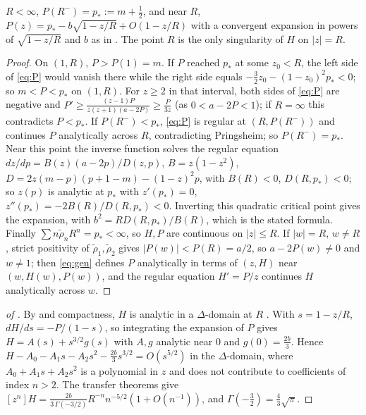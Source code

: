 \documentclass[11pt,a4paper]{report}
\newcommand{\rtil}{\tilde\rho}
\begin{document}
\begin{lemma}\label{lem:turning}
\(R<\infty\), \(P(R^-)=p_*:=m+\frac12\), and near \(R\),
\(P(z)=p_*-b\sqrt{1-z/R}+O(1-z/R)\) with a convergent expansion in powers of \(\sqrt{1-z/R}\) and \(b\) as in
. The point \(R\) is the only singularity of \(H\) on \(|z|=R\).
\end{lemma}
\begin{proof}
On \((1,R)\), \(P>P(1)=m\). If \(P\) reached \(p_*\) at some \(z_0<R\), the left side of \eqref{eq:P} would
vanish there while the right side equals \(-\frac32z_0-(1-z_0)^2p_*<0\); so \(m<P<p_*\) on \((1,R)\). For
\(z\ge2\) in that interval, both sides of \eqref{eq:P} are negative and
\(P'\ge\frac{(z-1)P}{z(z+1)(a-2P)}\ge\frac P{3z}\) (as \(0<a-2P<1\)); if \(R=\infty\) this contradicts
\(P<p_*\). If \(P(R^-)<p_*\), \eqref{eq:P} is regular at \((R,P(R^-))\) and continues \(P\) analytically
across \(R\), contradicting Pringsheim; so \(P(R^-)=p_*\). Near this point the inverse function solves the
regular equation \(dz/dp=B(z)(a-2p)/D(z,p)\), \(B=z(1-z^2)\), \(D=2z(m-p)(p+1-m)-(1-z)^2p\), with
\(B(R)<0\), \(D(R,p_*)<0\); so \(z(p)\) is analytic at \(p_*\) with \(z'(p_*)=0\),
\(z''(p_*)=-2B(R)/D(R,p_*)<0\). Inverting this quadratic critical point gives the expansion, with
\(b^2=RD(R,p_*)/B(R)\), which is the stated formula. Finally \(\sum n\rtil_nR^n=p_*<\infty\), so \(H,P\) are
continuous on \(|z|\le R\). If \(|w|=R\), \(w\ne R\), strict positivity of \(\rtil_1,\rtil_2\) gives
\(|P(w)|<P(R)=a/2\), so \(a-2P(w)\neq0\) and \(w\ne1\); then \eqref{eq:gen} defines \(P\) analytically in
terms of \((z,H)\) near \((w,H(w),P(w))\), and the regular equation \(H'=P/z\) continues \(H\) analytically
across \(w\).
\end{proof}

\begin{proof}[of ]
By  and compactness, \(H\) is analytic in a \(\Delta\)-domain at \(R\)
\autocite[Definition VI.1, Section VI.3]{FlajoletSedgewick2009}. With \(s=1-z/R\), \(dH/ds=-P/(1-s)\), so integrating the
expansion of \(P\) gives \(H=A(s)+s^{3/2}g(s)\) with \(A,g\) analytic near \(0\) and \(g(0)=\frac{2b}3\). Hence
\(H-A_0-A_1s-A_2s^2-\frac{2b}3s^{3/2}=O(s^{5/2})\) in the \(\Delta\)-domain, where \(A_0+A_1s+A_2s^2\) is a
polynomial in \(z\) and does not contribute to coefficients of index \(n>2\).
The transfer theorems \autocite[Theorems VI.1 and VI.3]{FlajoletSedgewick2009} give
\([z^n]H=\frac{2b}{3\,\Gamma(-3/2)}R^{-n}n^{-5/2}(1+O(n^{-1}))\), and \(\Gamma(-\frac32)=\frac43\sqrt\pi\).
\end{proof}
\end{document}
